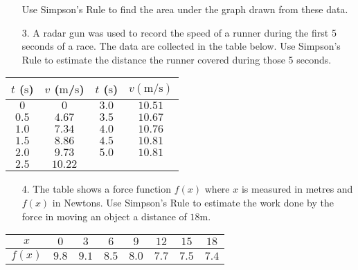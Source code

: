 \begin{enumerate}
\item [] Use Simpson's Rule to find the area under the graph drawn from these data.


\item [3.] A radar gun was used to record the speed of a runner during
the first 5 seconds of a race. The data are collected in the table below. Use
Simpson's Rule to estimate the distance the runner covered during those 5 seconds. \end{enumerate}


\qquad \qquad \qquad \qquad \qquad \qquad
\begin{tabular}[c]{|c|c||c|c|}\hline
$t$ ($\mbox{s}$)  & $v$ ($\mbox{m}$/$\mbox{s}$)  & $t$ ($\mbox{s}$)  & $v (\mathrm{m}/\mbox{s})$  \\
\hline
$0$  & $0$  & $3.0$  & $10.51$  \\
$0.5$  & $4.67$  & $3.5$  & $10.67$  \\
$1.0$  & $7.34$  & $4.0$  & $10.76$  \\
$1.5$  & $8.86$  & $4.5$  & $10.81$  \\
$2.0$  & $9.73$  & $5.0$  & $10.81$  \\
$2.5$  & $10.22$  &  &  \\
\hline
\end{tabular}


\begin{enumerate}
\item [4.] The table shows a force function $f (x)$ where $x$ is measured in metres and $f (x)$ in Newtons. Use Simpson's Rule to estimate the work done by the force in moving an object
a distance of $18 \mbox{m}$. \end{enumerate}


\qquad \qquad \qquad \qquad \qquad \qquad \qquad
\begin{tabular}[c]{|c|c|c|c|c|c|c|c|}\hline
$x$  & $0$  & $3$  & $6$  & $9$  & $12$  & $15$  & $18$  \\
\hline
\hline
$f (x)$  & $9.8$  & $9.1$  & $8.5$  & $8.0$  & $7.7$  & $7.5$  & $7.4$  \\
\hline
\end{tabular}

 

